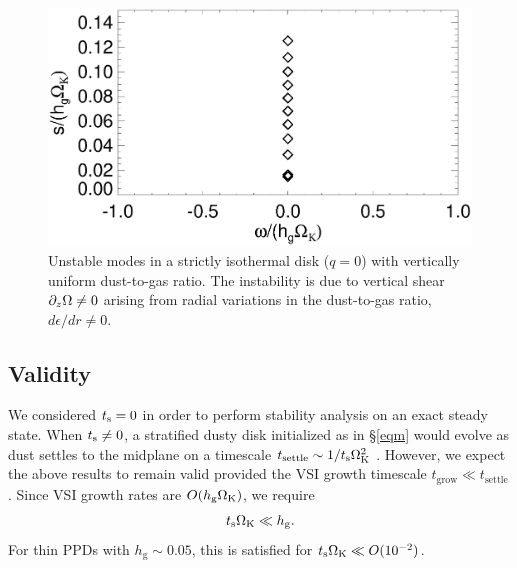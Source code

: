 \begin{figure}
  \includegraphics[width=\linewidth]{figures/vert_mixed_modes} 
  \caption{Unstable modes in a strictly isothermal disk ($q=0$) with
    vertically uniform dust-to-gas ratio. The instability is due to
    vertical shear $\partial_z\Omega\neq0$ arising from radial variations in
    the dust-to-gas ratio, $d\epsilon/dr\neq 0$. \label{vert_mixed_modes}
    }
\end{figure}



\subsection{Validity}
We considered $t_\mathrm{s}=0$ in order to perform stability analysis on an
exact steady state. When $t_\mathrm{s}\neq0$, a stratified dusty 
disk initialized as in \S\ref{eqm} would evolve 
as dust settles to the
midplane on a timescale $t_\mathrm{settle}\sim 1/t_\mathrm{s}\Omega_{\rm K}^2$
\citep{takeuchi02}. However, we expect the above results to remain
valid provided the VSI growth
timescale $t_\mathrm{grow}\ll t_\mathrm{settle}$. Since 
VSI growth rates are $O(h_\mathrm{g}\Omega_{\rm K})$, we require 
\begin{align}
  t_\mathrm{s}\Omega_{\rm K} \ll h_\mathrm{g}. 
\end{align} 
For thin PPDs with $h_\mathrm{g}\sim 0.05$, this is satisfied 
for $t_\mathrm{s}\Omega_{\rm K} \ll O(10^{-2})$.  

